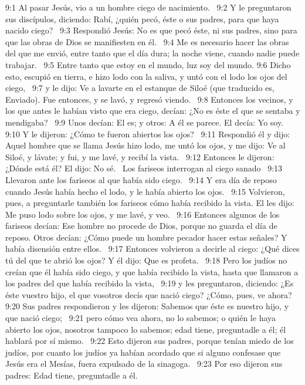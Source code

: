 9:1 Al pasar Jesús, vio a un hombre ciego de nacimiento.  
9:2 Y le preguntaron sus discípulos, diciendo: Rabí, ¿quién pecó, éste o sus padres, para que haya nacido ciego?  
9:3 Respondió Jesús: No es que pecó éste, ni sus padres, sino para que las obras de Dios se manifiesten en él.  
9:4 Me es necesario hacer las obras del que me envió, entre tanto que el día dura; la noche viene, cuando nadie puede trabajar.  
9:5 Entre tanto que estoy en el mundo, luz soy del mundo. 
9:6 Dicho esto, escupió en tierra, e hizo lodo con la saliva, y untó con el lodo los ojos del ciego,  
9:7 y le dijo: Ve a lavarte en el estanque de Siloé (que traducido es, Enviado). Fue entonces, y se lavó, y regresó viendo.  
9:8 Entonces los vecinos, y los que antes le habían visto que era ciego, decían: ¿No es éste el que se sentaba y mendigaba?  
9:9 Unos decían: El es; y otros: A él se parece. El decía: Yo soy.  
9:10 Y le dijeron: ¿Cómo te fueron abiertos los ojos?  
9:11 Respondió él y dijo: Aquel hombre que se llama Jesús hizo lodo, me untó los ojos, y me dijo: Ve al Siloé, y lávate; y fui, y me lavé, y recibí la vista.  
9:12 Entonces le dijeron: ¿Dónde está él? El dijo: No sé.  
Los fariseos interrogan al ciego sanado  
9:13 Llevaron ante los fariseos al que había sido ciego.  
9:14 Y era día de reposo cuando Jesús había hecho el lodo, y le había abierto los ojos.  
9:15 Volvieron, pues, a preguntarle también los fariseos cómo había recibido la vista. El les dijo: Me puso lodo sobre los ojos, y me lavé, y veo.  
9:16 Entonces algunos de los fariseos decían: Ese hombre no procede de Dios, porque no guarda el día de reposo. Otros decían: ¿Cómo puede un hombre pecador hacer estas señales? Y había disensión entre ellos.  
9:17 Entonces volvieron a decirle al ciego: ¿Qué dices tú del que te abrió los ojos? Y él dijo: Que es profeta.  
9:18 Pero los judíos no creían que él había sido ciego, y que había recibido la vista, hasta que llamaron a los padres del que había recibido la vista,  
9:19 y les preguntaron, diciendo: ¿Es éste vuestro hijo, el que vosotros decís que nació ciego? ¿Cómo, pues, ve ahora?  
9:20 Sus padres respondieron y les dijeron: Sabemos que éste es nuestro hijo, y que nació ciego;  
9:21 pero cómo vea ahora, no lo sabemos; o quién le haya abierto los ojos, nosotros tampoco lo sabemos; edad tiene, preguntadle a él; él hablará por sí mismo.  
9:22 Esto dijeron sus padres, porque tenían miedo de los judíos, por cuanto los judíos ya habían acordado que si alguno confesase que Jesús era el Mesías, fuera expulsado de la sinagoga.  
9:23 Por eso dijeron sus padres: Edad tiene, preguntadle a él.  
